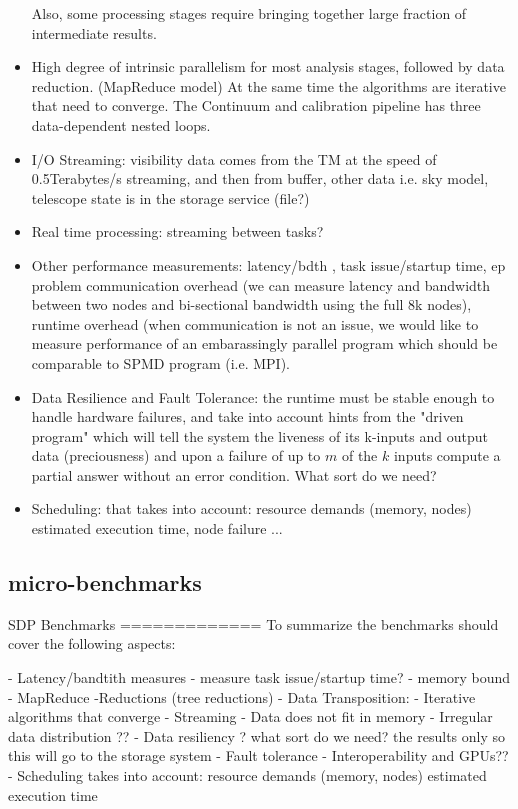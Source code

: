 \begin{itemize}
 Also, some processing stages require bringing together large fraction of intermediate results.
\item High degree of intrinsic parallelism for most analysis stages, followed by data reduction. (MapReduce model) At the same time the algorithms are
iterative that need to converge. The Continuum and calibration pipeline has three data-dependent nested loops. 
\item I/O Streaming: visibility data comes from the TM at the speed of 0.5Terabytes/s streaming, and then from buffer, other data i.e. sky model, telescope state is in the storage service (file?)
\item Real time processing: streaming between tasks?
\item Other performance measurements: latency/bdth , task issue/startup time, ep problem 
communication overhead (we can measure latency and bandwidth between two nodes and bi-sectional bandwidth using the full 8k nodes), runtime overhead (when communication is not an issue, we would like to measure performance of an embarassingly parallel program which should be comparable to SPMD program (i.e. MPI). 
\item Data Resilience and Fault Tolerance: the runtime must be stable enough to handle hardware failures, and take into account hints from the "driven program" which will tell the system the liveness of its k-inputs and output data (preciousness) and upon a failure of up to $m$ of the $k$ inputs compute a partial answer without an error condition. What sort do we need? 
\item Scheduling: that takes into account: resource demands (memory, nodes) estimated execution time, node failure ...
\end{itemize}

\subsection{micro-benchmarks}

SDP Benchmarks
=============
To summarize the benchmarks should cover the following aspects:

- Latency/bandtith measures
- measure task issue/startup time?
- memory bound 
- MapReduce -Reductions (tree reductions)
- Data Transposition:
- Iterative algorithms that converge
- Streaming
- Data does not fit in memory
- Irregular data distribution ??
- Data resiliency ? what sort do we need? the results only so this will go to the storage system
- Fault tolerance 
- Interoperability and GPUs??
- Scheduling takes into account: resource demands (memory, nodes) estimated execution time

